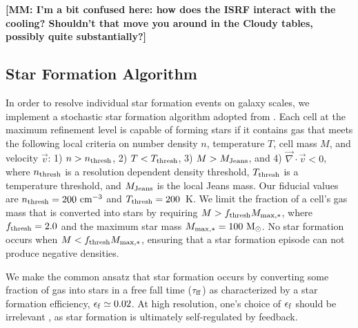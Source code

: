 \documentclass[twocolumn]{aastex61}
\begin{document}
   {\bf [MM: I'm a bit confused here: how does the ISRF interact with the cooling?  Shouldn't that move you around in the Cloudy tables, possibly quite substantially?]}

\subsection{Star Formation Algorithm}
\label{sec:star formation}
In order to resolve individual star formation events on galaxy scales, we implement a stochastic star formation algorithm adopted from \citet{Goldbaum2015,Goldbaum2016}. Each cell at the maximum refinement level is capable of forming stars if it contains gas that meets the following local criteria on number density $n$, temperature $T$, cell mass $M$, and velocity $\vec{v}$: 1) $n > n_{\rm thresh}$, 2) $T < T_{\rm thresh}$, 3) $M > M_{\rm Jeans}$, and 4) $\vec{\nabla} \cdot \vec{v} < 0$, where $n_{\rm thresh}$ is a resolution dependent density threshold, $T_{\rm thresh}$ is a temperature threshold, and $M_{\rm Jeans}$ is the local Jeans mass. Our fiducial values are $n_{\rm thresh} =  200 \mbox{ cm}^{-3}$ and $T_{\rm thresh}= 200$~K. We limit the fraction of a cell's gas mass that is converted into stars by requiring $M > f_{\rm thresh} M_{\rm max,*}$, where $f_{\rm thresh} = 2.0 $ and the maximum star mass $M_{\rm max,*} = 100 \mbox{ M}_{\odot}$. No star formation occurs when $M < f_{\rm thresh} M_{\rm max,*}$, ensuring that a star formation episode can not produce negative densities.

We make the common ansatz that star formation occurs by converting some fraction of gas into stars in a free fall time ($\tau_{\rm ff}$) as characterized by a star formation efficiency, $\epsilon_{\rm f} \simeq 0.02$. At high resolution, one's choice of $\epsilon_{\rm f}$ should be irrelevant \citep{Orr2017, FIRE2}, as star formation is ultimately self-regulated by feedback.
\end{document}

